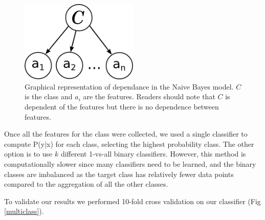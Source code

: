\documentclass[10pt,twocolumn]{article}
\begin{document}
\begin{figure}
    \centering  
    \includegraphics[width=0.5\textwidth]{./sysmag_bayes.png}
    \caption{Graphical representation of dependance in the Naive Bayes model. $C$ is the class and $a_i$ are the features. Readers should note that $C$ is dependent of the features but there is no dependence between features. }
    \label{bayesnet}
\end{figure}

Once all the features for the class were collected, we used a single classifier to compute P(y|x) for each class, selecting the highest probability class. The other option is to use $k$ different 1-vs-all binary classifiers. However, this method is computationally slower since many classifiers need to be learned, and the binary classes are imbalanced as the target class has relatively fewer data points compared to the aggregation of all the other classes.

To validate our results we performed 10-fold cross validation on our classifier (Fig \ref{multiclass}).
\end{document}
